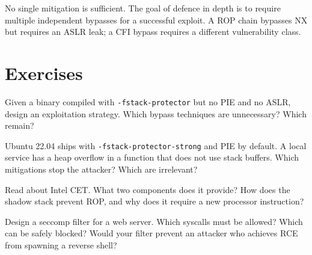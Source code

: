 \begin{principle}
	No single mitigation is sufficient. The goal of defence in depth is to require multiple independent bypasses for a successful exploit. A ROP chain bypasses NX but requires an ASLR leak; a CFI bypass requires a different vulnerability class.
\end{principle}

\section{Exercises}

\begin{exercise}
	Given a binary compiled with \texttt{-fstack-protector} but no PIE and no ASLR, design an exploitation strategy. Which bypass techniques are unnecessary? Which remain?
\end{exercise}

\begin{exercise}
	Ubuntu 22.04 ships with \texttt{-fstack-protector-strong} and PIE by default. A local service has a heap overflow in a function that does not use stack buffers. Which mitigations stop the attacker? Which are irrelevant?
\end{exercise}

\begin{exercise}
	Read about Intel CET. What two components does it provide? How does the shadow stack prevent ROP, and why does it require a new processor instruction?
\end{exercise}

\begin{exercise}
	Design a seccomp filter for a web server. Which syscalls must be allowed? Which can be safely blocked? Would your filter prevent an attacker who achieves RCE from spawning a reverse shell?
\end{exercise}
